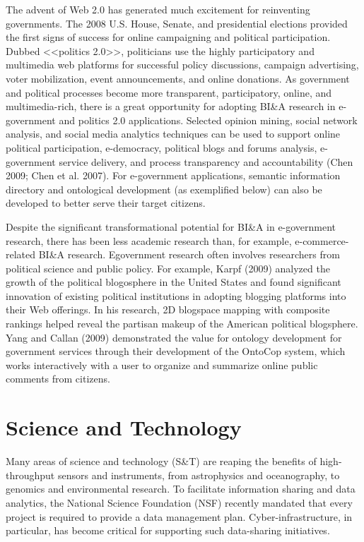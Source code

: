 The advent of Web 2.0 has generated much excitement for
reinventing governments. The 2008 U.S. House, Senate, and
presidential elections provided the first signs of success for
online campaigning and political participation. Dubbed
<<politics 2.0>>, politicians use the highly participatory and
multimedia web platforms for successful policy discussions,
campaign advertising, voter mobilization, event announcements,
and online donations. As government and political
processes become more transparent, participatory, online, and
multimedia-rich, there is a great opportunity for adopting
BI\&A research in e-government and politics 2.0 applications.
Selected opinion mining, social network analysis, and social
media analytics techniques can be used to support online
political participation, e-democracy, political blogs and
forums analysis, e-government service delivery, and process
transparency and accountability (Chen 2009; Chen et al.
2007). For e-government applications, semantic information
directory and ontological development (as exemplified below)
can also be developed to better serve their target citizens.

Despite the significant transformational potential for BI\&A in
e-government research, there has been less academic research
than, for example, e-commerce-related BI\&A research. Egovernment
research often involves researchers from political
science and public policy. For example, Karpf (2009) analyzed
the growth of the political blogosphere in the United
States and found significant innovation of existing political
institutions in adopting blogging platforms into their Web
offerings. In his research, 2D blogspace mapping with composite
rankings helped reveal the partisan makeup of the
American political blogsphere. Yang and Callan (2009)
demonstrated the value for ontology development for government
services through their development of the OntoCop
system, which works interactively with a user to organize and
summarize online public comments from citizens.

\section*{Science and Technology}

Many areas of science and technology (S\&T) are reaping the
benefits of high-throughput sensors and instruments, from
astrophysics and oceanography, to genomics and environmental
research. To facilitate information sharing and data
analytics, the National Science Foundation (NSF) recently
mandated that every project is required to provide a data
management plan. Cyber-infrastructure, in particular, has
become critical for supporting such data-sharing initiatives.

